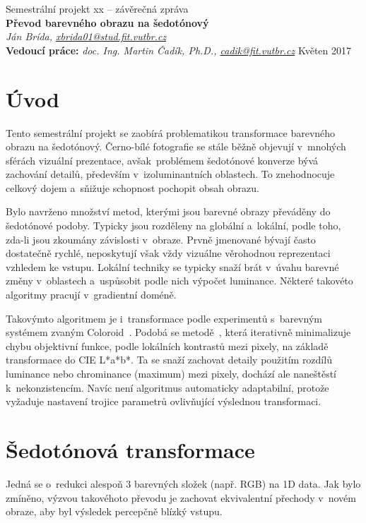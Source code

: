 \documentclass[11pt,a4paper,oneside]{article}
\begin{document}
	\thispagestyle{empty}
	\begin{center}
	\vspace*{60mm}
	{Semestrální projekt xx -- závěrečná zpráva }\\
	\smallskip
	{\Large\bf Převod barevného obrazu na šedotónový}\\
	\smallskip
	{\it Ján Brída, \url{xbrida01@stud.fit.vutbr.cz}}\\
	\vfill
	{\bf Vedoucí práce:} {\it doc. Ing. Martin Čadík, Ph.D., \url{cadik@fit.vutbr.cz}} 
	\hfill {Květen 2017}

	\end{center}
	\newpage

	\section{Úvod}
	Tento semestrální projekt se zaobírá problematikou transformace barevného obrazu
	na šedotónový. Černo-bílé fotografie se stále běžně objevují v~mnohých
	sférách vizuální prezentace, avšak~problémem šedotónové konverze bývá zachování
	detailů, především v~izoluminantních oblastech. To znehodnocuje celkový
	dojem a~sňižuje schopnost pochopit obsah obrazu.

	Bylo navrženo množství metod, kterými jsou barevné obrazy převáděny do šedotónové podoby.
	Typicky jsou rozděleny na globální a~lokální, podle toho, zda-li jsou zkoumány závislosti
	v~obraze. Prvně jmenované bývají často dostatečně rychlé, neposkytují však vždy vizuálne
	věrohodnou reprezentaci vzhledem ke vstupu. Lokální techniky se typicky snaží brát v~úvahu
	barevné změny v~oblastech a~uspůsobit podle nich výpočet luminance. Některé takovéto
	algoritmy pracují v~gradientní doméně.

	Takovýmto algoritmem je i~transformace podle experimentů s~barevným systémem
	zvaným Coloroid~\cite{cadik07color_to_gray}. Podobá se metodě~\cite{gooch2005color2gray},
	která iterativně minimalizuje chybu objektivní funkce, podle lokálních kontrastů mezi pixely, na základě
	transformace do CIE L*a*b*. Ta se snaží zachovat detaily použitím rozdílů luminance
	nebo chrominance (maximum) mezi pixely, dochází ale naneštěstí k~nekonzistencím.
	Navíc není algoritmus automaticky adaptabilní, protože vyžaduje nastavení
	trojice parametrů ovlivňující výslednou transformaci.

	\section{Šedotónová transformace}
	Jedná se o~redukci alespoň 3 barevných složek (např. RGB) na 1D data.
	Jak bylo zmíněno, výzvou takovéhoto převodu je zachovat ekvivalentní
	přechody v~novém obraze, aby byl výsledek percepčně blízký vstupu.
\end{document}
